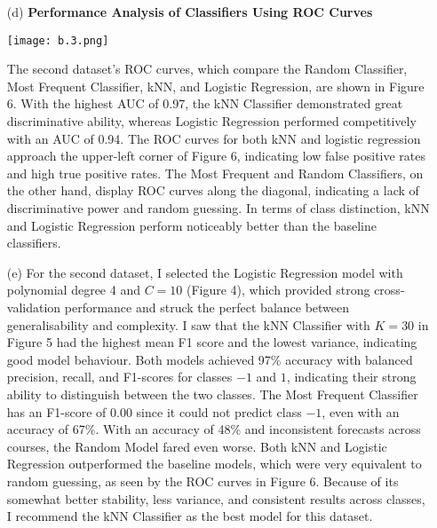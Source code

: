 \documentclass[a4paper,10pt]{article}
\begin{document}
\begin{enumerate}
\item[(d)] \textbf{Performance Analysis of Classifiers Using ROC Curves}
 \begin{center}
        \centering
        \texttt{[image: b.3.png]}
        \label{}
    \end{center} 
    The second dataset's ROC curves, which compare the Random Classifier, Most Frequent Classifier, kNN, and Logistic Regression, are shown in Figure 6. With the highest AUC of 0.97, the kNN Classifier demonstrated great discriminative ability, whereas Logistic Regression performed competitively with an AUC of 0.94. The ROC curves for both kNN and logistic regression approach the upper-left corner of Figure 6, indicating low false positive rates and high true positive rates. The Most Frequent and Random Classifiers, on the other hand, display ROC curves along the diagonal, indicating a lack of discriminative power and random guessing. In terms of class distinction, kNN and Logistic Regression perform noticeably better than the baseline classifiers.
\item[(e)]
For the second dataset, I selected the Logistic Regression model with polynomial degree 4 and $C = 10$ (Figure 4), which provided strong cross-validation performance and struck the perfect balance between generalisability and complexity. I saw that the kNN Classifier with $K = 30$ in Figure 5 had the highest mean F1 score and the lowest variance, indicating good model behaviour. Both models achieved 97\% accuracy with balanced precision, recall, and F1-scores for classes $-1$ and $1$, indicating their strong ability to distinguish between the two classes. The Most Frequent Classifier has an F1-score of 0.00 since it could not predict class $-1$, even with an accuracy of 67\%. With an accuracy of 48\% and inconsistent forecasts across courses, the Random Model fared even worse. Both kNN and Logistic Regression outperformed the baseline models, which were very equivalent to random guessing, as seen by the ROC curves in Figure 6. Because of its somewhat better stability, less variance, and consistent results across classes, I recommend the kNN Classifier as the best model for this dataset.
\end{enumerate}
\end{document}
